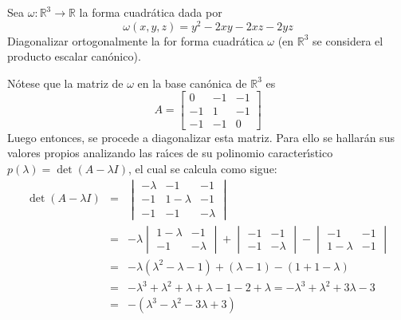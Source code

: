 \begin{enunciado}
 Sea $\omega: \mathbb{R}^3 \to \mathbb{R}$ la forma cuadr\'atica dada por
 \begin{equation*}
  \omega(x,y,z) = y^2 - 2xy - 2xz - 2yz
 \end{equation*}
 Diagonalizar ortogonalmente la for forma cuadr\'atica $\omega$ (en $\mathbb{R}^3$ se considera el producto escalar can\'onico).
\end{enunciado}
 
\begin{solucion}
 N\'otese que la matriz de $\omega$ en la base can\'onica de $\mathbb{R}^3$ es
 \begin{equation*}
  A =
  \begin{bmatrix}
    0 & -1 & -1 \\
   -1 &  1 & -1 \\
   -1 & -1 &  0
  \end{bmatrix}
 \end{equation*}
 Luego entonces, se procede a diagonalizar esta matriz. Para ello se hallar\'an sus valores propios analizando las ra\'{\i}ces de su polinomio caracter\'{\i}stico $p(\lambda) = \det(A - \lambda I)$, el cual se calcula como sigue:
 \begin{eqnarray*}
  \det(A - \lambda I) & = & 
  \begin{vmatrix}
   -\lambda & -1 & -1 \\
   -1 & 1-\lambda & -1 \\
   -1 & -1 & - \lambda 
  \end{vmatrix}
  \\
  & = &
  -\lambda 
  \begin{vmatrix}
   1-\lambda & -1 \\
   -1 & -\lambda
  \end{vmatrix}
  +
  \begin{vmatrix}
   -1 & -1 \\
   -1 & -\lambda 
  \end{vmatrix}
  -
  \begin{vmatrix}
   -1 & -1 \\
   1-\lambda & -1
  \end{vmatrix} 
  \\
  & = & -\lambda(\lambda^2-\lambda -1) + (\lambda  - 1) - (1 + 1 - \lambda) \\ 
  & = & -\lambda^3 + \lambda^2 +\lambda + \lambda - 1 - 2 + \lambda  = -\lambda^3 + \lambda^2 + 3\lambda - 3 \\
  & = & -(\lambda^3 - \lambda^2 - 3\lambda + 3) \\

\end{eqnarray*}
\end{solucion}
